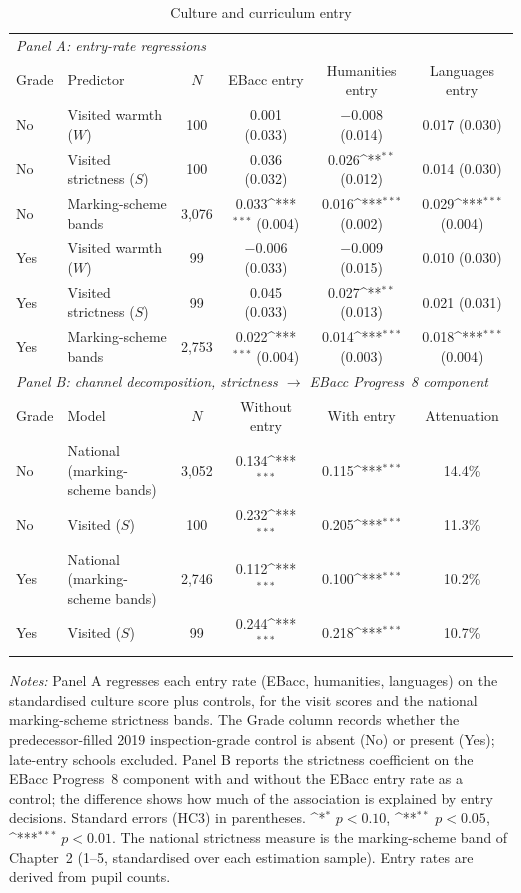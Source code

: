 \begin{table}[htbp]\centering
\caption{Culture and curriculum entry}
\label{tab:entry_rates}
\def\sym#1{\ifmmode^{#1}\else\(^{#1}\)\fi}
\small
\footnotesize\setlength{\tabcolsep}{4pt}
\begin{tabular}{llcccc}
\toprule
\multicolumn{6}{l}{\textit{Panel A: entry-rate regressions}} \\
\addlinespace[2pt]
Grade & Predictor & $N$ & EBacc entry & Humanities entry & Languages entry \\
\midrule
No & Visited warmth ($W$) & 100 & 0.001 (0.033) & $-$0.008 (0.014) & 0.017 (0.030) \\
No & Visited strictness ($S$) & 100 & 0.036 (0.032) & 0.026\sym{**} (0.012) & 0.014 (0.030) \\
No & Marking-scheme bands & 3{,}076 & 0.033\sym{***} (0.004) & 0.016\sym{***} (0.002) & 0.029\sym{***} (0.004) \\
\addlinespace
Yes & Visited warmth ($W$) & 99 & $-$0.006 (0.033) & $-$0.009 (0.015) & 0.010 (0.030) \\
Yes & Visited strictness ($S$) & 99 & 0.045 (0.033) & 0.027\sym{**} (0.013) & 0.021 (0.031) \\
Yes & Marking-scheme bands & 2{,}753 & 0.022\sym{***} (0.004) & 0.014\sym{***} (0.003) & 0.018\sym{***} (0.004) \\
\midrule
\multicolumn{6}{l}{\textit{Panel B: channel decomposition, strictness $\rightarrow$ EBacc Progress~8 component}} \\
\addlinespace[2pt]
Grade & Model & $N$ & Without entry & With entry & Attenuation \\
\midrule
No & National (marking-scheme bands) & 3{,}052 & 0.134\sym{***} & 0.115\sym{***} & 14.4\% \\
No & Visited ($S$) & 100 & 0.232\sym{***} & 0.205\sym{***} & 11.3\% \\
Yes & National (marking-scheme bands) & 2{,}746 & 0.112\sym{***} & 0.100\sym{***} & 10.2\% \\
Yes & Visited ($S$) & 99 & 0.244\sym{***} & 0.218\sym{***} & 10.7\% \\
\bottomrule
\end{tabular}
\begin{minipage}{\linewidth}
\smallskip
\footnotesize\textit{Notes:} Panel A regresses each entry rate (EBacc, humanities, languages) on the standardised culture score plus controls, for the visit scores and the national marking-scheme strictness bands. The Grade column records whether the predecessor-filled 2019 inspection-grade control is absent (No) or present (Yes); late-entry schools excluded. Panel B reports the strictness coefficient on the EBacc Progress~8 component with and without the EBacc entry rate as a control; the difference shows how much of the association is explained by entry decisions. Standard errors (HC3) in parentheses.
\sym{*} \(p<0.10\), \sym{**} \(p<0.05\), \sym{***} \(p<0.01\).
The national strictness measure is the marking-scheme band of Chapter~2
(1--5, standardised over each estimation sample).
Entry rates are derived from pupil counts. 
\end{minipage}
\end{table}

